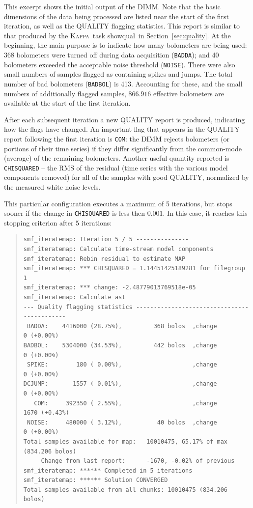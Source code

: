 \documentclass[twoside,11pt]{article}
\newcommand{\xref}[3]{#1}
\renewcommand{\_}{\texttt{\symbol{95}}}
\newenvironment{myquote}{\begin{quote}\begin{small}}{\end{small}\end{quote}}
\newcommand{\Kappa}{\xref{\textsc{Kappa}}{sun95}{}}
\newcommand{\task}[1]{\textsf{#1}}
\newcommand{\showqual}{\xref{\task{showqual}}{sun95}{SHOWQUAL}}
\begin{document}
\begin{myquote}
\begin{verbatim}
\end{verbatim}
\end{myquote}

This excerpt shows the initial output of the DIMM. Note that the basic
dimensions of the data being processed are listed near the start of
the first iteration, as well as the QUALITY flagging statistics. This
report is similar to that produced by the \Kappa\ task \showqual\ in
Section~\ref{sec:quality}. At the beginning, the main purpose is to
indicate how many bolometers are being used: 368 bolometers were
turned off during data acquisition (\texttt{BADDA}); and 40 bolometers
exceeded the acceptable noise threshold (\texttt{NOISE}). There were
also small numbers of samples flagged as containing spikes and
jumps. The total number of bad bolometers (\texttt{BADBOL}) is
413. Accounting for these, and the small numbers of additionally
flagged samples, $866.916$ effective bolometers are available at the
start of the first iteration.

After each subsequent iteration a new QUALITY report is produced,
indicating how the flags have changed. An important flag that appears
in the QUALITY report following the first iteration is \texttt{COM}:
the DIMM rejects bolometers (or portions of their time series) if they
differ significantly from the common-mode (average) of the remaining
bolometers. Another useful quantity reported is \texttt{CHISQUARED} --
the RMS of the residual (time series with the various model components
removed) for all of the samples with good QUALITY, normalized by the
measured white noise levels.

This particular configuration executes a maximum of 5 iterations, but
stops sooner if the change in \texttt{CHISQUARED} is less then
0.001. In this case, it reaches this stopping criterion after 5
iterations:

\begin{myquote}
\begin{verbatim}
smf_iteratemap: Iteration 5 / 5 ---------------
smf_iteratemap: Calculate time-stream model components
smf_iteratemap: Rebin residual to estimate MAP
smf_iteratemap: *** CHISQUARED = 1.14451425189281 for filegroup 1
smf_iteratemap: *** change: -2.48779013769518e-05
smf_iteratemap: Calculate ast
--- Quality flagging statistics --------------------------------------------
 BADDA:    4416000 (28.75%),         368 bolos  ,change          0 (+0.00%)
BADBOL:    5304000 (34.53%),         442 bolos  ,change          0 (+0.00%)
 SPIKE:        180 ( 0.00%),                    ,change          0 (+0.00%)
DCJUMP:       1557 ( 0.01%),                    ,change          0 (+0.00%)
   COM:     392350 ( 2.55%),                    ,change       1670 (+0.43%)
 NOISE:     480000 ( 3.12%),          40 bolos  ,change          0 (+0.00%)
Total samples available for map:   10010475, 65.17% of max (834.206 bolos)
     Change from last report:      -1670, -0.02% of previous
smf_iteratemap: ****** Completed in 5 iterations
smf_iteratemap: ****** Solution CONVERGED
Total samples available from all chunks: 10010475 (834.206 bolos)
\end{verbatim}
\end{myquote}
\end{document}
